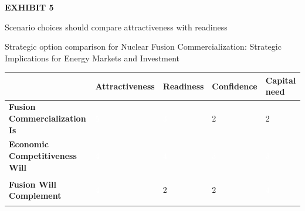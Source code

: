 \documentclass[10pt,a4paper]{article}
\begin{document}
\clearpage
{\textcolor{BOGreen}{\scriptsize\bfseries EXHIBIT 5}}\par\vspace{4pt}
{\sffamily\fontsize{17}{21}\selectfont\color{BONavy} Scenario choices should compare attractiveness with readiness}\par
{\small\color{BOText} Strategic option comparison for Nuclear Fusion Commercialization: Strategic Implications for Energy Markets and Investment}\par\vspace{6pt}
{\scriptsize\begin{tabular}{p{38mm}>{\centering\arraybackslash}p{21mm}>{\centering\arraybackslash}p{21mm}>{\centering\arraybackslash}p{21mm}>{\centering\arraybackslash}p{21mm}}
 & {\bfseries Attractiveness} & {\bfseries Readiness} & {\bfseries Confidence} & {\bfseries Capital need} \\
\hline
{\bfseries Fusion Commercialization Is} & \colorbox{BOGreen}{\textcolor{white}{\strut\hspace{5pt}5\hspace{5pt}}} & \colorbox{BOBlue}{\textcolor{white}{\strut\hspace{5pt}3\hspace{5pt}}} & \colorbox{BOLight}{\textcolor{BOText}{\strut\hspace{5pt}2\hspace{5pt}}} & \colorbox{BOLight}{\textcolor{BOText}{\strut\hspace{5pt}2\hspace{5pt}}} \\
{\bfseries Economic Competitiveness Will} & \colorbox{BOGreen}{\textcolor{white}{\strut\hspace{5pt}4\hspace{5pt}}} & \colorbox{BOGreen}{\textcolor{white}{\strut\hspace{5pt}4\hspace{5pt}}} & \colorbox{BOBlue}{\textcolor{white}{\strut\hspace{5pt}3\hspace{5pt}}} & \colorbox{BOBlue}{\textcolor{white}{\strut\hspace{5pt}3\hspace{5pt}}} \\
{\bfseries Fusion Will Complement} & \colorbox{BOGreen}{\textcolor{white}{\strut\hspace{5pt}4\hspace{5pt}}} & \colorbox{BOLight}{\textcolor{BOText}{\strut\hspace{5pt}2\hspace{5pt}}} & \colorbox{BOLight}{\textcolor{BOText}{\strut\hspace{5pt}2\hspace{5pt}}} & \colorbox{BOGreen}{\textcolor{white}{\strut\hspace{5pt}4\hspace{5pt}}} \\

\end{tabular}}
\end{document}

